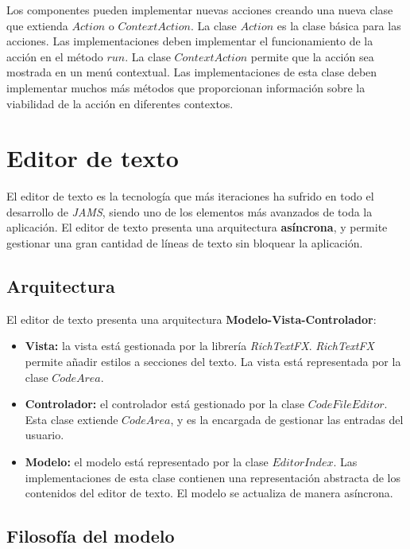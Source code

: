 \noindent Los componentes pueden implementar nuevas acciones
creando una nueva clase que extienda $Action$ o $ContextAction$.
La clase $Action$ es la clase básica para las acciones.
Las implementaciones deben implementar el funcionamiento
de la acción en el método $run$.
La clase $ContextAction$ permite que la acción sea
mostrada en un menú contextual.
Las implementaciones de esta clase deben implementar
muchos más métodos que proporcionan información
sobre la viabilidad de la acción en diferentes contextos.


\section{Editor de texto}\label{sec:editor-de-texto}

El editor de texto es la tecnología que más iteraciones
ha sufrido en todo el desarrollo de \textit{JAMS},
siendo uno de los elementos más avanzados de toda
la aplicación.
El editor de texto presenta una arquitectura
\textbf{asíncrona}, y permite gestionar una gran
cantidad de líneas de texto sin bloquear la aplicación.

\subsection{Arquitectura}\label{subsec:arquitectura}

El editor de texto presenta una arquitectura
\textbf{Modelo-Vista-Controlador}:
\begin{itemize}
    \item \textbf{Vista:} la vista está gestionada
    por la librería \textit{RichTextFX}\cite{RICH_TEXT_FX}.
    \textit{RichTextFX} permite añadir estilos
    a secciones del texto.
    La vista está representada por la clase
    $CodeArea$.
    \item \textbf{Controlador:} el controlador está
    gestionado por la clase $CodeFileEditor$.
    Esta clase extiende $CodeArea$, y es la
    encargada de gestionar las entradas del usuario.
    \item \textbf{Modelo:} el modelo está representado
    por la clase $EditorIndex$.
    Las implementaciones de esta clase contienen
    una representación abstracta de los contenidos
    del editor de texto.
    El modelo se actualiza de manera asíncrona.
\end{itemize}

\subsection{Filosofía del modelo}\label{subsec:filosofía-del-modelo}


